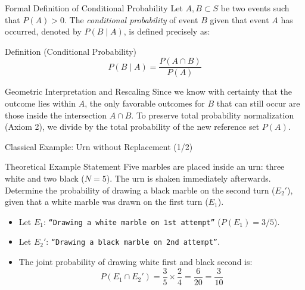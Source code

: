 \documentclass[10pt,aspectratio=169]{beamer}
\begin{document}
\begin{frame}{Formal Definition of Conditional Probability}
  \small Let $A, B \subset S$ be two events such that $P(A) > 0$. The \emph{conditional probability} of event $B$ given that event $A$ has occurred, denoted by $P(B \mid A)$, is defined precisely as: \pause

  \vspace{0.2em}
  \begin{block}{Definition (Conditional Probability)}
    $$P(B \mid A) = \dfrac{P(A \cap B)}{P(A)}$$
  \end{block}

  \vspace{0.1em}
  \pause
  \begin{alertblock}{Geometric Interpretation and Rescaling}
    Since we know with certainty that the outcome lies within $A$, the only favorable outcomes for $B$ that can still occur are those inside the intersection $A \cap B$. To preserve total probability normalization (Axiom 2), we divide by the total probability of the new reference set $P(A)$.
  \end{alertblock}
\end{frame}

\begin{frame}{Classical Example: Urn without Replacement (1/2)}
  \small
  \begin{block}{Theoretical Example Statement}
    Five marbles are placed inside an urn: three white and two black ($N = 5$). The urn is shaken immediately afterwards. Determine the probability of drawing a black marble on the second turn ($E_2'$), given that a white marble was drawn on the first turn ($E_1$).
  \end{block}

  \vspace{0.2em}
  \pause
  \begin{itemize}\itemsep=0.1em
    \item Let $E_1$: \texttt{``Drawing a white marble on 1st attempt''} ($P(E_1) = 3/5$). \pause
    \item Let $E_2'$: \texttt{``Drawing a black marble on 2nd attempt''}. \pause
    \item The joint probability of drawing white first and black second is:
    $$P(E_1 \cap E_2') = \dfrac{3}{5} \times \dfrac{2}{4} = \dfrac{6}{20} = \dfrac{3}{10}$$
  \end{itemize}
\end{frame}
\end{document}
